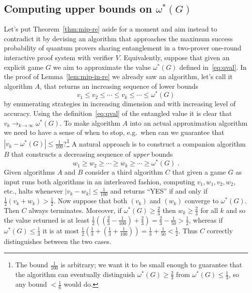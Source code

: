 \subsection{Computing upper bounds on $\omega^*(G)$}
\label{sec:ub-game}

Let's put Theorem~\ref{thm:mip-re} aside for a moment and aim instead to contradict it by devising an algorithm that approaches the maximum success probability of quantum provers sharing entanglement in a two-prover one-round interactive proof system with verifier $V$. Equivalently, suppose that given an explicit game $G$ we aim to approximate the value $\omega^*(G)$ defined in~\eqref{eq:qval}. In the proof of Lemma~\ref{lem:mip-in-re} we already saw an algorithm, let's call it algorithm $A$, that returns an increasing sequence of lower bounds 
\[ v_1 \leq v_2 \leq \cdots \leq v_k \leq \cdots \leq \omega^*(G)\]
by enumerating strategies in increasing dimension and with increasing level of accuracy. Using the definition~\eqref{eq:qval} of the entangled value it is clear that $v_k \to_{k\to\infty} \omega^*(G)$. To make algorithm $A$ into an actual approximation algorithm we need to have a sense of when to stop, e.g.\ when can we guarantee that $|v_k -\omega^*(G)|\leq \frac{1}{100}$?\footnote{The bound $\frac{1}{100}$ is arbitrary; we want it to be small enough to guarantee that the algorithm can eventually distinguish $\omega^*(G)\geq\frac{2}{3}$ from $\omega^*(G) \leq\frac{1}{3}$, so any bound $<\frac{1}{6}$ would do.} A natural approach is to construct a companion algorithm $B$ that constructs a decreasing sequence of \emph{upper} bounds 
\[ w_1 \geq w_2 \geq \cdots \geq w_k \geq \cdots \geq \omega^*(G)\;.\]
Given algorithms $A$ and $B$ consider a third algorithm $C$ that given a game $G$ as input runs both algorithms in an interleaved fashion, computing $v_1,w_1,v_2,w_2$, etc., halts whenever $|v_k-w_k|\leq \frac{1}{100}$ and returns ``YES'' if and only if $\frac{1}{2}(v_k+w_k) > \frac{1}{2}$. Now suppose that both $(v_k)$ and $(w_k)$ converge to $\omega^*(G)$. Then $C$ always terminates. Moreover, if $\omega^*(G) \geq \frac{2}{3}$ then $w_k \geq \frac{2}{3}$ for all $k$ and so the value returned is at least $\frac{1}{2}((\frac{2}{3}-\frac{1}{100})+\frac{2}{3})=\frac{2}{3}-\frac{1}{50} > \frac{1}{2}$, whereas if $\omega^*(G) \leq \frac{1}{3}$ it is at most $\frac{1}{2}(\frac{1}{3}+(\frac{1}{3}+\frac{1}{100}))=\frac{1}{3}+\frac{1}{50} < \frac{1}{2}$. Thus $C$ correctly distinguishes between the two cases. 

